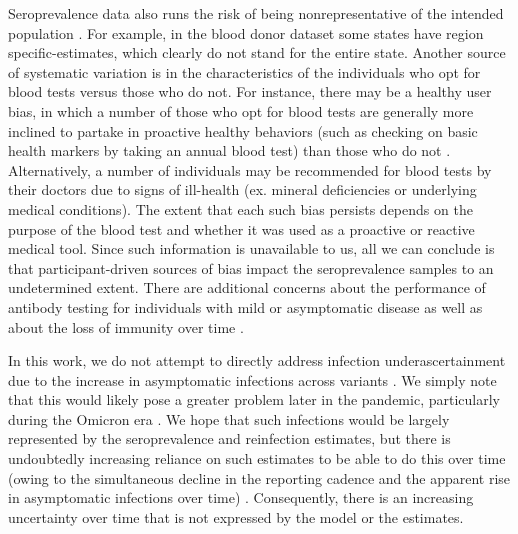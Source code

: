 \documentclass{article}
\begin{document}
Seroprevalence data also runs the risk of being nonrepresentative of the
intended population \citep{bajema2021estimated}. For example, in the blood donor
dataset some states have region specific-estimates, which clearly do not stand
for the entire state. Another source of systematic variation is in the
characteristics of the individuals who opt for blood tests versus those who do
not. For instance, there may be a healthy user bias, in which a number of those
who opt for blood tests are generally more inclined to partake in proactive
healthy behaviors (such as checking on basic health markers by taking an annual
blood test) than those who do not \citep{parsley2018blood}. Alternatively, a
number of individuals may be recommended for blood tests by their doctors due to
signs of ill-health (ex. mineral deficiencies or underlying medical
conditions). The extent that each such bias persists depends on the purpose of
the blood test and whether it was used as a proactive or reactive medical tool.
Since such information is unavailable to us, all we can conclude is that
participant-driven sources of bias impact the seroprevalence samples to an
undetermined extent. There are additional concerns about the performance of
antibody testing for individuals with mild or asymptomatic disease as well as about
the loss of immunity over time \citep{kaku2021performance, seow2020longitudinal,
ibarrondo2020rapid}.

In this work, we do not attempt to directly address infection underascertainment
due to the increase in asymptomatic infections across variants
\citep{pho2023covid19}. We simply note that this would likely pose a greater
problem later in the pandemic, particularly during the Omicron era
\citep{fan2022sars}. We hope that such infections would be largely represented
by the seroprevalence and reinfection estimates, but there is undoubtedly
increasing reliance on such estimates to be able to do this over time (owing to
the simultaneous decline in the reporting cadence and the apparent rise in
asymptomatic infections over time) \citep{oph2022covid, garrett2022high,
blauer2022reduce, ren2021asymptomatic}. Consequently, there is an increasing
uncertainty over time that is not expressed by the model or the estimates.   
\end{document}
